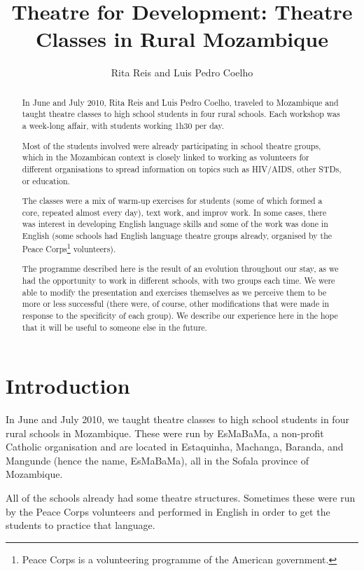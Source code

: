 \documentclass[article,twocolumn,twoside]{memoir}
\title{Theatre for Development: Theatre Classes in Rural Mozambique}
\author{Rita Reis and Luis Pedro Coelho}
\begin{document}
\maketitle

\begin{abstract}
In June and July 2010, Rita Reis and Luis Pedro Coelho, traveled to Mozambique
and taught theatre classes to high school students in four rural schools. Each
workshop was a week-long affair, with students working 1h30 per day.

Most of the students involved were already participating in school theatre
groups, which in the Mozambican context is closely linked to working as
volunteers for different organisations to spread information on topics such as
HIV/AIDS, other STDs, or education.

The classes were a mix of warm-up exercises for students (some of which formed
a core, repeated almost every day), text work, and improv work. In some cases,
there was interest in developing English language skills and some of the work
was done in English (some schools had English language theatre groups already,
organised by the Peace Corps\footnote{Peace Corps is a volunteering programme
of the American government.} volunteers).

The programme described here is the result of an evolution throughout our stay,
as we had the opportunity to work in different schools, with two groups each
time. We were able to modify the presentation and exercises themselves as we
perceive them to be more or less successful (there were, of course, other
modifications that were made in response to the specificity of each group). We
describe our experience here in the hope that it will be useful to someone else
in the future.

\end{abstract}

\chapter{Introduction}
In June and July 2010, we taught theatre classes to high school students in
four rural schools in Mozambique. These were run by EsMaBaMa, a non-profit
Catholic organisation and are located in Estaquinha, Machanga, Baranda, and
Mangunde (hence the name, EsMaBaMa), all in the Sofala province of Mozambique.

All of the schools already had some theatre structures. Sometimes these were
run by the Peace Corps volunteers and performed in English in order to get the
students to practice that language.
\end{document}
